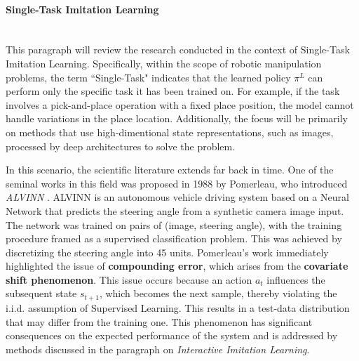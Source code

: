 \paragraph*{Single-Task Imitation Learning}\mbox{}\\
This paragraph will review the research conducted in the context of Single-Task Imitation Learning. Specifically, within the scope of robotic manipulation problems, the term ``Single-Task" indicates that the learned policy $\pi^{L}$ can perform only the specific task it has been trained on. For example, if the task involves a pick-and-place operation with a fixed place position, the model cannot handle variations in the place location. Additionally, the focus will be primarily on methods that use high-dimentional state representations, such as images, processed by deep architectures to solve the problem.

In this scenario, the scientific literature extends far back in time. One of the seminal works in this field was proposed in 1988 by Pomerleau, who introduced \textit{ALVINN} \cite{pomerleau1988alvinn}. ALVINN is an autonomous vehicle driving system based on a Neural Network that predicts the steering angle from a synthetic camera image input. The network was trained on pairs of (image, steering angle), with the training procedure framed as a supervised classification problem. This was achieved by discretizing the steering angle into 45 units. Pomerleau's work immediately highlighted the issue of \textbf{compounding error}, which arises from the \textbf{covariate shift phenomenon}. This issue occurs because an action $a_{t}$ influences the subsequent state $s_{t+1}$, which becomes the next sample, thereby violating the i.i.d. assumption of Supervised Learning. This results in a test-data distribution that may differ from the training one. This phenomenon has significant consequences on the expected performance of the system and is addressed by methods discussed in the paragraph on \textit{Interactive Imitation Learning}.

